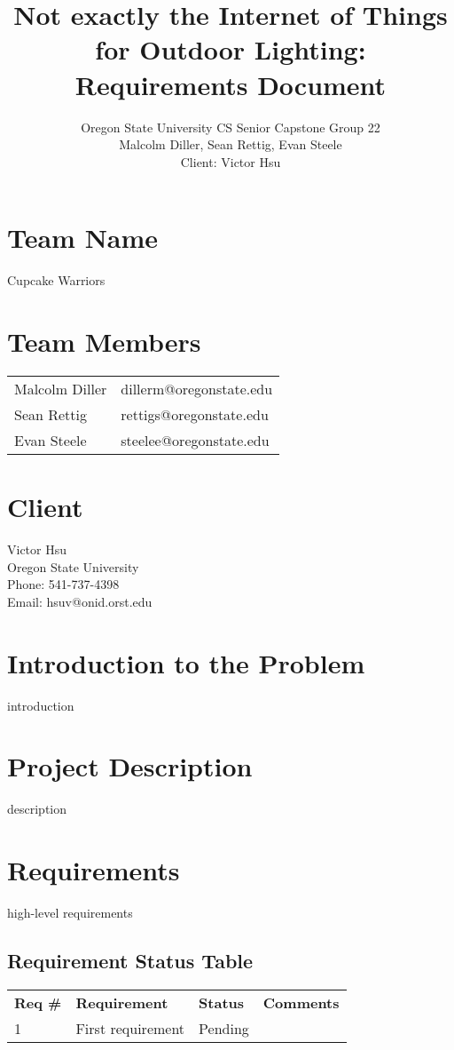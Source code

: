 \documentclass[12pt]{article}
\title{Not exactly the Internet of Things for Outdoor Lighting: Requirements Document}
\author{Oregon State University CS Senior Capstone Group 22\\Malcolm Diller, Sean Rettig, Evan Steele\\Client: Victor Hsu}
\begin{document}
 

\maketitle

\pagebreak

\section{Team Name}

Cupcake Warriors

\section{Team Members}

\begin{tabular}{ l l } 
    Malcolm Diller & dillerm@oregonstate.edu\\ 
    Sean Rettig & rettigs@oregonstate.edu\\
    Evan Steele & steelee@oregonstate.edu\\ \end{tabular}

\section{Client}

Victor Hsu\\
Oregon State University\\
Phone: 541-737-4398\\
Email: hsuv@onid.orst.edu

\section{Introduction to the Problem}

introduction

\section{Project Description}

description

\section{Requirements}

high-level requirements

\subsection{Requirement Status Table}
\begin{tabular}{p{1cm}|p{7cm}|p{2cm}|p{2cm}} 
    \textbf{Req \#} & \textbf{Requirement} & \textbf{Status}& \textbf{Comments}\\
    1 & First requirement & Pending &\\
\end{tabular}
\end{document}
